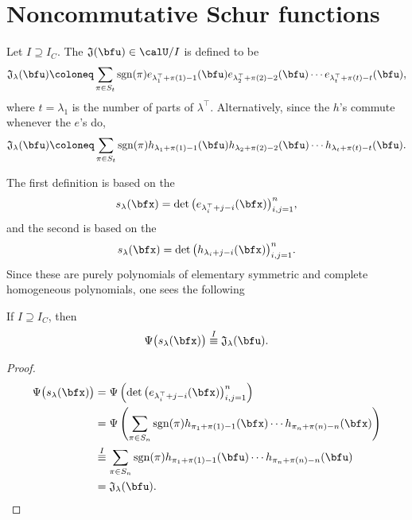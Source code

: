 \documentclass{article}
\newcommand*\frkJ{\mathfrak{J}}
\newcommand*\sgn{\operatorname{sgn}}
\begin{document}
\section{
    Noncommutative Schur functions
}

\begin{definition}
    Let $I \supseteq I_C$.
    The  $\frkJ(\bfu) \in \calU/I$ is defined to be
    \[
        \frkJ_\lambda(\bfu)
        \coloneq
        \sum_{\pi \in S_{t}}
        \sgn(\pi)
        e_{\lambda^\top_1+\pi(1)-1}(\bfu)
        e_{\lambda^\top_2+\pi(2)-2}(\bfu)
        \cdots
        e_{\lambda^\top_{t}+\pi(t)-t}(\bfu),
    \]
    where $t = \lambda_1$ is the number of parts of $\lambda^\top$.
    Alternatively, since the $h$'s commute whenever the $e$'s do,
    \[
        \frkJ_\lambda(\bfu)
        \coloneq
        \sum_{\pi \in S_{t}}
        \sgn(\pi)
        h_{\lambda_1+\pi(1)-1}(\bfu)
        h_{\lambda_2+\pi(2)-2}(\bfu)
        \cdots
        h_{\lambda_t+\pi(t)-t}(\bfu).
    \]
\end{definition}

The first definition is based on the 
\[
    s_\lambda(\bfx)
    =
    \det\big(e_{\lambda^\top_i+j-i}(\bfx)\big)_{i,j=1}^n,
\]
and the second is based on the 
\[
    s_\lambda(\bfx)
    =
    \det\big(h_{\lambda_i+j-i}(\bfx)\big)_{i,j=1}^n.
\]
Since these are purely polynomials of elementary symmetric and complete homogeneous polynomials, one sees the following
\begin{definition}
    If $I \supseteq I_C$, then
    \[
        \Psi\big(s_\lambda(\bfx)\big)
        \overset{I}{\equiv}
        \frkJ_\lambda(\bfu).
    \]
\end{definition}
\begin{proof}
    \begin{align*}
        \Psi\big(s_\lambda(\bfx)\big)
        &=
        \Psi \left(
            \det\big(e_{\lambda^\top_i+j-i}(\bfx)\big)_{i,j=1}^n
        \right)
        \\
        &=
        \Psi \left(
            \sum_{\pi \in S_n}
            \sgn(\pi)
            h_{\pi_1+\pi(1)-1}(\bfx)
            \cdots
            h_{\pi_n+\pi(n)-n}(\bfx)
        \right)
        \\
        &\overset{I}{\equiv}
        \sum_{\pi \in S_n}
        \sgn(\pi)
        h_{\pi_1+\pi(1)-1}(\bfu)
        \cdots
        h_{\pi_n+\pi(n)-n}(\bfu)
        \\
        &=
        \frkJ_\lambda(\bfu).
    \end{align*}
\end{proof}
\end{document}
